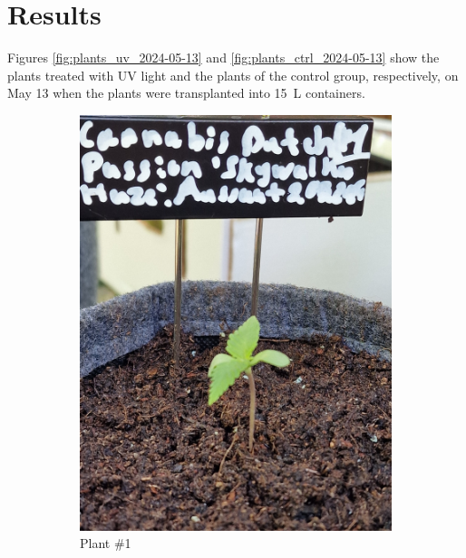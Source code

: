\section{Results}

Figures \ref{fig:plants_uv_2024-05-13} and \ref{fig:plants_ctrl_2024-05-13} show the plants treated with UV light and the plants of the control group, respectively, on May 13 when the plants were transplanted into \qty[mode=text]{15}{\L} containers.

\begin{figure}[H]
    \begin{subfigure}[t]{.19\textwidth}
        \includegraphics[width=\linewidth]{../figures/plant_01_2024-05-13}
        \caption{Plant \#1}
        \label{fig:plant_01_2024-05-13}
    \end{subfigure}
    \hfill
    \begin{subfigure}[t]{.19\textwidth}

\end{subfigure}
\end{figure}
